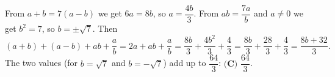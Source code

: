 From $a+b=7(a-b)$ we get $6a=8b$, so $a=\dfrac{4b}{3}$. From $ab=\dfrac{7a}{b}$ and $a\ne0$ we get $b^2=7$, so $b=\pm\sqrt7$. Then
\[(a+b)+(a-b)+ab+\dfrac ab=2a+ab+\dfrac ab=\dfrac{8b}{3}+\dfrac{4b^2}{3}+\dfrac43=\dfrac{8b}{3}+\dfrac{28}{3}+\dfrac43=\dfrac{8b+32}{3}.\]
The two values (for $b=\sqrt7$ and $b=-\sqrt7$) add up to $\dfrac{64}{3}$: $\boxed{\textbf{(C) }\dfrac{64}{3}}$.
